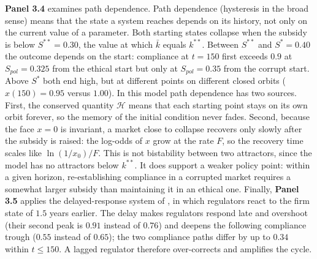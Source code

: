 \documentclass[10pt]{article}
\newcommand{\kbar}{\bar{k}}
\begin{document}
\textbf{Panel 3.4} examines path dependence. Path dependence (hysteresis in the broad sense) means that the state a system reaches depends on its history, not only on the current value of a parameter. Both starting states collapse when the subsidy is below $S^{**}=0.30$, the value at which $\kbar$ equals $k^{**}$. Between $S^{**}$ and $S^*=0.40$ the outcome depends on the start: compliance at $t=150$ first exceeds $0.9$ at $S_{pol}=0.325$ from the ethical start but only at $S_{pol}=0.35$ from the corrupt start. Above $S^*$ both end high, but at different points on different closed orbits ($x(150)=0.95$ versus $1.00$). In this model path dependence has two sources. First, the conserved quantity $\mathcal{H}$ means that each starting point stays on its own orbit forever, so the memory of the initial condition never fades. Second, because the face $x=0$ is invariant, a market close to collapse recovers only slowly after the subsidy is raised: the log-odds of $x$ grow at the rate $F$, so the recovery time scales like $\ln(1/x_0)/F$. This is not bistability between two attractors, since the model has no attractors below $k^{**}$. It does support a weaker policy point: within a given horizon, re-establishing compliance in a corrupted market requires a somewhat larger subsidy than maintaining it in an ethical one. Finally, \textbf{Panel 3.5} applies the delayed-response system of , in which regulators react to the firm state of $1.5$ years earlier. The delay makes regulators respond late and overshoot (their second peak is $0.91$ instead of $0.76$) and deepens the following compliance trough ($0.55$ instead of $0.65$); the two compliance paths differ by up to $0.34$ within $t\le150$. A lagged regulator therefore over-corrects and amplifies the cycle.
\end{document}
